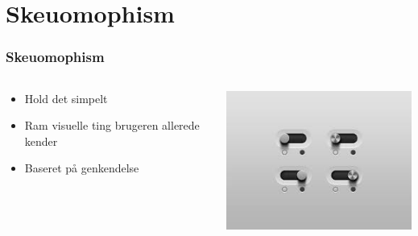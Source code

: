 \documentclass{beamer}
\begin{document}
\section{Skeuomophism}
\begin{frame}
\frametitle{Skeuomophism}
  \begin{columns}[T]
    \begin{column}{.5\textwidth}
	  \begin{itemize}
		\item Hold det simpelt
		\item Ram visuelle ting brugeren allerede kender
		\item Baseret på genkendelse
	  \end{itemize}
    \end{column}
    \begin{column}{.5\textwidth}
      \includegraphics[width=\textwidth]{button.jpg}
    \end{column}
  \end{columns}
\end{frame}
\end{document}

